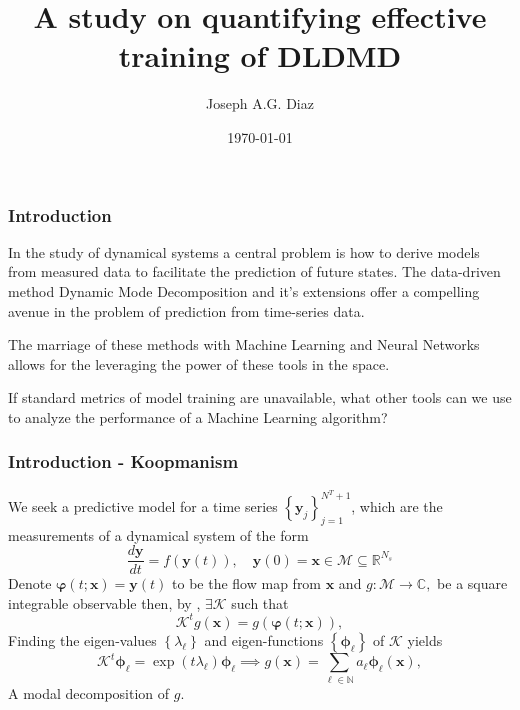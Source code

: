 \documentclass[11pt,aspectratio=169]{beamer}
\title{A study on quantifying effective training of DLDMD}
\author{Joseph A.G. Diaz}
\institute{Master of Science in Applied Mathematics\\ 
           with a Concentration in Dynamical Systems,\\
           San Diego State University}
\date{\today}
\newcommand{\parens}[1]{\left(#1\right)}
\newcommand{\bracks}[1]{\left\{#1\right\}}
\newcommand{\R}{\mathbb{R}}
\newcommand{\N}{\mathbb{N}}
\newcommand{\C}{\mathbb{C}}
\newcommand{\dd}[2]{\frac{d#1}{d#2}}
\begin{document}
    \frame{\titlepage}

    \begin{frame}
        \frametitle{Introduction}

        In the study of dynamical systems a central problem is how to derive models 
        from measured data to facilitate the prediction of future states. The data-driven
        method Dynamic Mode Decomposition and it's extensions offer a compelling avenue
        in the problem of prediction from time-series data.
        \vspace{1cm}

        The marriage of these methods with Machine Learning and Neural Networks allows for
        the leveraging the power of these tools in the space. 
        \vspace{1cm}

        If standard metrics of model training are unavailable, what other tools can we use 
        to analyze the performance of a Machine Learning algorithm?
    
    \end{frame}

    \begin{frame}
        \frametitle{Introduction - Koopmanism}
        We seek a predictive model for a time series 
        $\bracks{\boldsymbol{y}_j}_{j=1}^{N^T+1}$, which are the measurements of a 
        dynamical system of the form
        \begin{equation}
            \dd{\boldsymbol{y}}{t} = f\parens{\boldsymbol{y}(t)},\quad \boldsymbol{y}(0) 
            = \boldsymbol{x} \in \mathcal{M} \subseteq \R^{N_s}
        \end{equation}
        Denote $\boldsymbol{\varphi}(t;\boldsymbol{x}) =
        \boldsymbol{y}(t)$ to be the flow map from $\boldsymbol{x}$
        and $g: \mathcal{M} \to \C,$ be a square integrable 
        observable then, by \cite{koopman}, $\exists \mathcal{K}$ such that
        \begin{equation}
            \mathcal{K}^t g(\boldsymbol{x}) = g(\boldsymbol{\varphi}(t; \boldsymbol{x})),
        \end{equation}
        Finding the eigen-values $\bracks{\lambda_\ell}$ and 
        eigen-functions $\bracks{\boldsymbol{\phi}_\ell}$ of $\mathcal{K}$ yields
        \begin{equation}
            \mathcal{K}^t\boldsymbol{\phi}_\ell = \exp(t\lambda_\ell)\boldsymbol{\phi}
            _\ell \implies g(\boldsymbol{x}) = \sum_{\ell \in \N} a_\ell \boldsymbol{\phi}_
            \ell(\boldsymbol{x}),    
        \end{equation}
        A modal decomposition of $g$.

    
    \end{frame}
\end{document}
